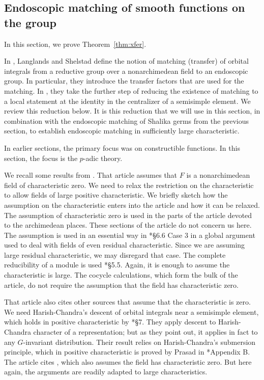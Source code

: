 \documentclass[12pt]{amsart}
\theoremstyle{plain}
\theoremstyle{definition}
\begin{document}
\subsection{Endoscopic matching of smooth functions on the group}
\label{sec:xfer}

In this section, we prove Theorem~\ref{thm:xfer}. 

In \cite{LSxf}, Langlands and Shelstad define the notion of matching
(transfer) of orbital integrals from a reductive group over a
nonarchimedean field to an endoscopic group.  In particular, they
introduce the transfer factors that are used for the matching.  In
\cite{LSd}, they take the further step of reducing the existence of
matching to a local statement at the identity in the centralizer of a
semisimple element.  We review this reduction below.  It is this
reduction that we will use in this section, in combination with the
endoscopic matching of Shalika germs from the previous section, to
establish endoscopic matching in sufficiently large characteristic.

In earlier sections, the primary focus was on constructible
functions.  In this section, the focus is the $p$-adic theory.

We recall some results from \cite{LSd}.  That article assumes that $F$
is a nonarchimedean field of characteristic zero.  We need to relax the
restriction on the characteristic to allow fields of large positive
characteristic.  We briefly sketch how the assumption on the
characteristic enters into the article \cite{LSd} and how it can be
relaxed.  The assumption of characteristic zero is used in the parts
of the article devoted to the archimedean places.  These sections of the
article do not concern us here.  The assumption is used in an essential
way in \cite{LSd}*{\S 6.6 Case 3} in a global argument used to deal
with fields of even residual characteristic.  Since we are assuming
large residual characteristic, we may disregard that case. The
complete reducibility of a module is used \cite{LSd}*{\S 5.5}. Again,
it is enough to assume the characteristic is large.  The cocycle
calculations, which form the bulk of the article, do not require the
assumption that the field has characteristic zero.

That article also cites other sources that assume that the
characteristic is zero.  We need Harish-Chandra's descent of orbital
integrals near a semisimple element, which holds in positive
characteristic by \cite{adler-korman}*{\S 7}. They apply descent to
Harish-Chandra character of a representation; but as they point out,
it applies in fact to any $G$-invariant distribution. Their result
relies on Harish-Chandra's submersion principle, which in positive
characteristic is proved by Prasad in
\cite{adler-debacker:mktheory}*{Appendix B}.  The article cites
\cite{LSxf}, which also assumes the field has characteristic zero. But
here again, the arguments are readily adapted to large
characteristics.
\end{document}
